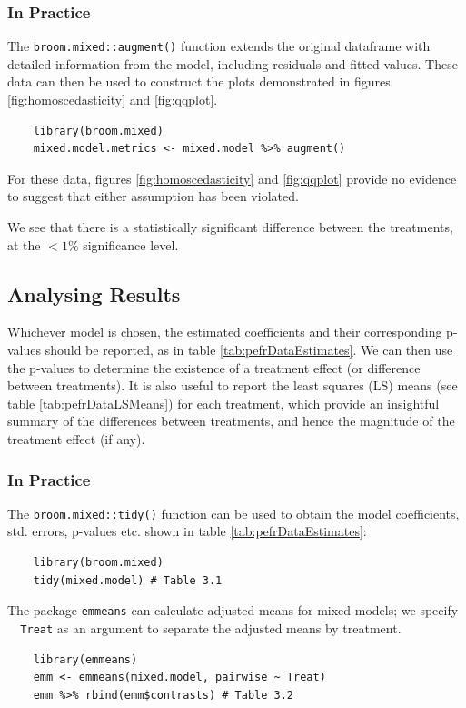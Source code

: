 \documentclass[12pt, TexShade, letterpaper]{report}
\begin{document}
\subsubsection{In Practice}
The \texttt{broom.mixed::augment()} function extends the original dataframe with detailed information from the model, including residuals and fitted values. These data can then be used to construct the plots demonstrated in figures \ref{fig:homoscedasticity} and \ref{fig:qqplot}.

\begin{verbatim}
    library(broom.mixed)
    mixed.model.metrics <- mixed.model %>% augment()
\end{verbatim}

For these data, figures \ref{fig:homoscedasticity} and \ref{fig:qqplot} provide no evidence to suggest that either assumption has been violated.

We see that there is a statistically significant difference between the treatments, at the $<1\%$ significance level.

\subsection{Analysing Results}
Whichever model is chosen, the estimated coefficients and their corresponding p-values should be reported, as in table \ref{tab:pefrDataEstimates}. We can then use the p-values to determine the existence of a treatment effect (or difference between treatments). It is also useful to report the least squares (LS) means (see table \ref{tab:pefrDataLSMeans}) for each treatment, which provide an insightful summary of the differences between treatments, and hence the magnitude of the treatment effect (if any).




\subsubsection{In Practice}
The \texttt{broom.mixed::tidy()} function can be used to obtain the model coefficients, std. errors, p-values etc. shown in table \ref{tab:pefrDataEstimates}:
\begin{verbatim}
    library(broom.mixed)
    tidy(mixed.model) # Table 3.1
\end{verbatim}
The package \texttt{emmeans} can calculate adjusted means for mixed models; we specify \texttt{~ Treat} as an argument to separate the adjusted means by treatment.
\begin{verbatim}
    library(emmeans)
    emm <- emmeans(mixed.model, pairwise ~ Treat)
    emm %>% rbind(emm$contrasts) # Table 3.2
\end{verbatim}
\end{document}
